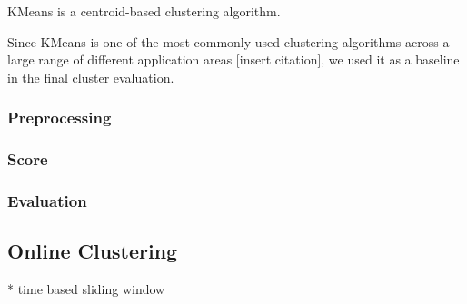 KMeans is a centroid-based clustering algorithm. 


Since KMeans is one of the most commonly used clustering algorithms across a large range of different application areas [insert citation], we used it as a baseline in the final cluster evaluation.

\subsubsection{Preprocessing}


\subsubsection{Score}

\subsubsection{Evaluation}




\subsection{Online Clustering}

* time based sliding window

